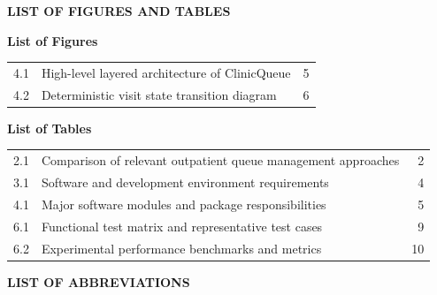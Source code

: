 \documentclass[12pt,a4paper,oneside]{report}
\begin{document}
\newpage
{}
\begin{center}
    {\Large \textbf{LIST OF FIGURES AND TABLES}}\\[0.25cm]
\end{center}

\noindent
\textbf{List of Figures}
\vspace{0.1cm}

\noindent
\begin{tabularx}{\textwidth}{p{1.2cm} X r}
4.1 & High-level layered architecture of ClinicQueue & 5 \\
4.2 & Deterministic visit state transition diagram & 6 \\
\end{tabularx}

\vspace{0.3cm}
\noindent
\textbf{List of Tables}
\vspace{0.1cm}

\noindent
\begin{tabularx}{\textwidth}{p{1.2cm} X r}
2.1 & Comparison of relevant outpatient queue management approaches & 2 \\
3.1 & Software and development environment requirements & 4 \\
4.1 & Major software modules and package responsibilities & 5 \\
6.1 & Functional test matrix and representative test cases & 9 \\
6.2 & Experimental performance benchmarks and metrics & 10 \\
\end{tabularx}

\vspace{0.4cm}
\begin{center}
    {\Large \textbf{LIST OF ABBREVIATIONS}}\\[0.2cm]
\end{center}
\end{document}
